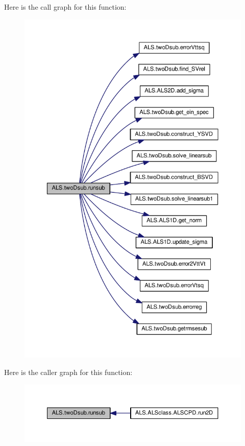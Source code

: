 Here is the call graph for this function\+:
\nopagebreak
\begin{figure}[H]
\begin{center}
\leavevmode
\includegraphics[width=350pt]{namespace_a_l_s_1_1two_dsub_a2f5605fed0568b72d992d8e6cea524fb_cgraph}
\end{center}
\end{figure}




Here is the caller graph for this function\+:
\nopagebreak
\begin{figure}[H]
\begin{center}
\leavevmode
\includegraphics[width=350pt]{namespace_a_l_s_1_1two_dsub_a2f5605fed0568b72d992d8e6cea524fb_icgraph}
\end{center}
\end{figure}


